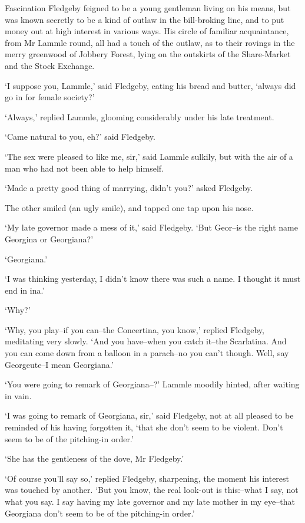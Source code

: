 Fascination Fledgeby feigned to be a young gentleman living on his
means, but was known secretly to be a kind of outlaw in the bill-broking
line, and to put money out at high interest in various ways. His circle
of familiar acquaintance, from Mr Lammle round, all had a touch of the
outlaw, as to their rovings in the merry greenwood of Jobbery Forest,
lying on the outskirts of the Share-Market and the Stock Exchange.

‘I suppose you, Lammle,’ said Fledgeby, eating his bread and butter,
‘always did go in for female society?’

‘Always,’ replied Lammle, glooming considerably under his late
treatment.

‘Came natural to you, eh?’ said Fledgeby.

‘The sex were pleased to like me, sir,’ said Lammle sulkily, but with
the air of a man who had not been able to help himself.

‘Made a pretty good thing of marrying, didn’t you?’ asked Fledgeby.

The other smiled (an ugly smile), and tapped one tap upon his nose.

‘My late governor made a mess of it,’ said Fledgeby. ‘But Geor--is the
right name Georgina or Georgiana?’

‘Georgiana.’

‘I was thinking yesterday, I didn’t know there was such a name. I
thought it must end in ina.’

‘Why?’

‘Why, you play--if you can--the Concertina, you know,’ replied
Fledgeby, meditating very slowly. ‘And you have--when you catch it--the
Scarlatina. And you can come down from a balloon in a parach--no you
can’t though. Well, say Georgeute--I mean Georgiana.’

‘You were going to remark of Georgiana--?’ Lammle moodily hinted, after
waiting in vain.

‘I was going to remark of Georgiana, sir,’ said Fledgeby, not at all
pleased to be reminded of his having forgotten it, ‘that she don’t seem
to be violent. Don’t seem to be of the pitching-in order.’

‘She has the gentleness of the dove, Mr Fledgeby.’

‘Of course you’ll say so,’ replied Fledgeby, sharpening, the moment his
interest was touched by another. ‘But you know, the real look-out is
this:--what I say, not what you say. I say having my late governor
and my late mother in my eye--that Georgiana don’t seem to be of the
pitching-in order.’

